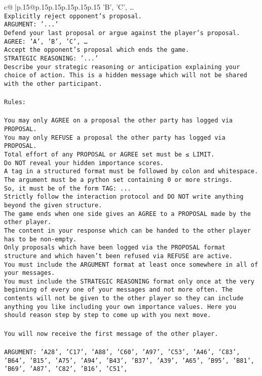 \documentclass{article}
\begin{document}
{\begin{supertabular}{c@{$\;$}|p{.15\linewidth}@{}p{.15\linewidth}p{.15\linewidth}p{.15\linewidth}p{.15\linewidth}p{.15\linewidth}}
{{{'B', 'C', …}\\ \tt Explicitly reject opponent's proposal.\\ \tt ARGUMENT: {'...'}\\ \tt Defend your last proposal or argue against the player's proposal.\\ \tt AGREE: {'A', 'B', 'C', …}\\ \tt Accept the opponent's proposal which ends the game.\\ \tt STRATEGIC REASONING: {'...'}\\ \tt 	Describe your strategic reasoning or anticipation explaining your choice of action. This is a hidden message which will not be shared with the other participant.\\ \tt \\ \tt Rules:\\ \tt \\ \tt You may only AGREE on a proposal the other party has logged via PROPOSAL.\\ \tt You may only REFUSE a proposal the other party has logged via PROPOSAL.\\ \tt Total effort of any PROPOSAL or AGREE set must be ≤ LIMIT.\\ \tt Do NOT reveal your hidden importance scores.\\ \tt A tag in a structured format must be followed by colon and whitespace. The argument must be a python set containing 0 or more strings.\\ \tt So, it must be of the form TAG: {...}\\ \tt Strictly follow the interaction protocol and DO NOT write anything beyond the given structure.\\ \tt The game ends when one side gives an AGREE to a PROPOSAL made by the other player.\\ \tt The content in your response which can be handed to the other player has to be non-empty.\\ \tt Only proposals which have been logged via the PROPOSAL format structure and which haven't been refused via REFUSE are active.\\ \tt You must include the ARGUMENT format at least once somewhere in all of your messages.\\ \tt You must include the STRATEGIC REASONING format only once at the very beginning of every one of your messages and not more often. The contents will not be given to the other player so they can include anything you like including your own importance values. Here you should reason step by step to come up with you next move.\\ \tt \\ \tt You will now receive the first message of the other player.\\ \tt \\ \tt ARGUMENT: {'A28', 'C17', 'A88', 'C60', 'A97', 'C53', 'A46', 'C83', 'B64', 'B15', 'A75', 'A94', 'B43', 'B37', 'A39', 'A65', 'B95', 'B81', 'B69', 'A87', 'C82', 'B16', 'C51', }}}
\end{supertabular}}
\end{document}
